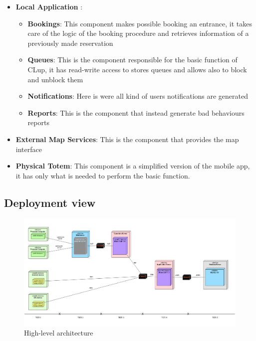 \begin{itemize}
	\item \textbf{Local Application }:
	\begin{itemize}
		\item \textbf{Bookings}: This component makes possible booking an entrance, it takes care of the logic of the booking procedure and retrieves information of a previously made reservation
		\item \textbf{Queues}: This is the component responsible for the basic function of CLup, it has read-write access to stores queues and allows also to block and unblock them
		\item \textbf{Notifications}: Here is were all kind of users notifications are generated
		\item \textbf{Reports}: This is the component that instead generate bad behaviours reports
	\end{itemize}
	\item \textbf{External Map Services}: This is the component that provides the map interface
	\item \textbf{Physical Totem}: This component is a simplified version of the mobile app, it has only what is needed to perform the basic function.
\end{itemize}

\subsection{Deployment view}
\begin{figure}[H]
	\includegraphics[width=\linewidth]{../Diagrams/deployment_diagram.png}
	\caption{High-level architecture}
	\label{fig:HLArch}
\end{figure}

